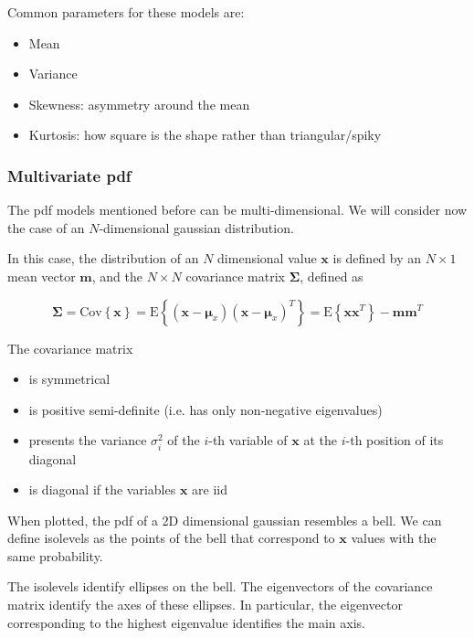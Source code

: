 \documentclass[oneside,onecolumn]{report}
\newcommand{\E}[1]{\text{E} \left\{ #1 \right\}}
\newcommand{\Cov}[1]{\text{Cov} \left\{ #1 \right\}}
\begin{document}
Common parameters for these models are:
\begin{itemize}
    \item Mean
    \item Variance
    \item Skewness: asymmetry around the mean
    \item Kurtosis: how square is the shape rather than triangular/spiky
\end{itemize}


\subsubsection{Multivariate pdf}

The pdf models mentioned before can be multi-dimensional.
We will consider now the case of an $N$-dimensional gaussian distribution.

In this case, the distribution of an $N$ dimensional value $\bm x$ is defined by an $N \times 1$ mean vector $\bm m$, and the $N \times N$ covariance matrix $\bm \Sigma$, defined as

$$ \bm \Sigma = \Cov{\bm x} = \E{(\bm x - \bm \mu_x)(\bm x - \bm \mu_x)^T} = \E{\bm x \bm x^T} - \bm m \bm m^T $$

The covariance matrix
\begin{itemize}
    \item is symmetrical
    \item is positive semi-definite (i.e. has only non-negative eigenvalues)
    \item presents the variance $\sigma_i^2$ of the $i$-th variable of $\bm x$ at the $i$-th position of its diagonal
    \item is diagonal if the variables $\bm x$ are iid
\end{itemize}

When plotted, the pdf of a 2D dimensional gaussian resembles a bell.
We can define isolevels as the points of the bell that correspond to $\bm x$ values with the same probability.

The isolevels identify ellipses on the bell.
The eigenvectors of the covariance matrix identify the axes of these ellipses.
In particular, the eigenvector corresponding to the highest eigenvalue identifies the main axis.
\end{document}
